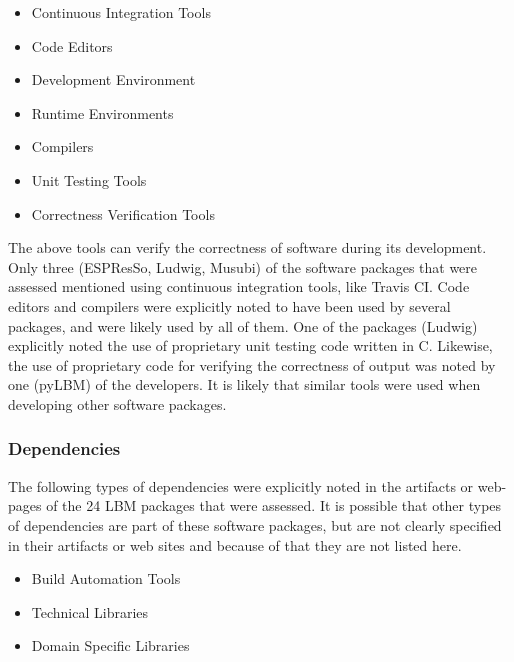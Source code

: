\documentclass[final, 3p, times, authoryear]{elsarticle}
\begin{document}
	\begin{multicols}{2}	
		\begin{itemize}
			
			\item Continuous Integration Tools
			\item Code Editors
			\item Development Environment
			\item Runtime Environments
			\item Compilers
			\item Unit Testing Tools
			\item Correctness Verification Tools
			
		\end{itemize}
	\end{multicols}

The above tools can verify the correctness of software during its development.
Only three (ESPResSo, Ludwig, Musubi) of the software packages that were assessed mentioned using continuous integration tools, like Travis CI. Code editors and compilers were explicitly noted to have been used by several packages, and were likely used by all of them. One of the packages (Ludwig) explicitly noted the use of proprietary unit testing code written in C. Likewise, the use of proprietary code for verifying the correctness of output was noted by one (pyLBM) of the developers. It is likely that similar tools were used when developing other software packages. 

\subsubsection{Dependencies}

The following types of dependencies were explicitly noted in the artifacts or
web-pages of the 24 LBM packages that were assessed. It is possible that other
types of dependencies are part of these software packages, but are not clearly
specified in their artifacts or web sites and because of that they are not
listed here.

	\begin{multicols}{2}	
		\begin{itemize}
			
			\item Build Automation Tools
			\item Technical Libraries
			\item Domain Specific Libraries
		
		\end{itemize}
	\end{multicols}
\end{document}
